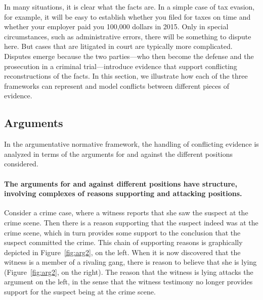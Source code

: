 \documentclass[10pt]{article}
\begin{document}
In many situations, it is clear what the facts are. In a simple case of tax evasion, for example, 
it will be easy to establish whether you filed for taxes on time and whether your employer paid you 100,000 dollars in 2015. Only in special circumstances, 
such as administrative errors, there will be something to dispute here. 
But cases that are litigated in court are typically more complicated.
Disputes emerge because the two parties---who then become the defense and the 
prosecution in a criminal trial---introduce evidence that support conflicting 
reconstructions of the facts. In this section, we illustrate how 
each of the three frameworks can represent and model conflicts 
between different pieces of evidence. 





\subsection{Arguments}
\label{sec:confArg}


In the argumentative normative framework, the handling of conflicting evidence is analyzed in terms of the arguments for and against the different positions considered.

\paragraph{The arguments for and against different positions have structure, involving complexes of reasons supporting and attacking positions.} 

Consider a crime case, where a witness reports that she saw the suspect at the crime scene. Then there is a reason supporting that the suspect indeed was at the crime scene, which in turn provides some support to the conclusion that the suspect committed the crime. This chain of supporting reasons is graphically depicted in Figure~\ref{fig:arg2}, on the left. 
When it is now discovered that the witness is a member of a rivaling gang, there is reason to believe that she is lying (Figure~\ref{fig:arg2}, on the right). The reason that the witness is lying attacks the argument on the left, in the sense that the witness testimony no longer provides support for the suspect being at the crime scene.
\end{document}
